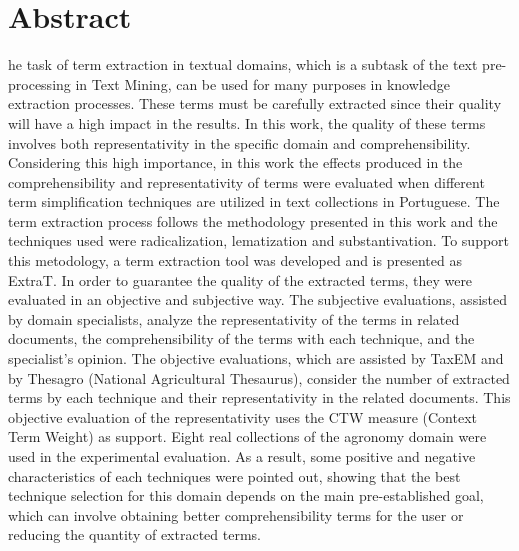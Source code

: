 \chapter*{Abstract}
\thispagestyle{empty}


he task of term extraction in textual domains, which is a subtask of the text pre-processing in Text Mining, can be used for many purposes in knowledge extraction processes. These terms must be carefully extracted since their quality will have a high impact in the results. In this work, the quality of these terms involves both representativity in the specific domain and comprehensibility. Considering this high importance, in this work the effects produced in the comprehensibility and representativity of terms were evaluated when different term simplification techniques are utilized in text collections in Portuguese. The term extraction process follows the methodology presented in this work and the techniques used were radicalization, lematization and substantivation. To support this metodology, a term extraction tool  was developed and is presented as ExtraT. In order to guarantee the quality of the extracted terms, they were evaluated in an objective and subjective way. The subjective evaluations, assisted by domain specialists, analyze the representativity of the terms in related documents, the comprehensibility of the terms with each technique, and the specialist's opinion. The objective evaluations, which are assisted by TaxEM and by Thesagro (National Agricultural Thesaurus), consider the number of extracted terms by each technique and their representativity in the related documents. This objective evaluation of the representativity uses the CTW measure (Context Term Weight) as support. Eight real collections of the agronomy domain were used in the experimental evaluation. As a result, some positive and negative characteristics of each techniques were pointed out, showing that the best technique selection for this domain depends on the main pre-established goal, which can involve obtaining better comprehensibility terms for the user or reducing the quantity of extracted terms.
